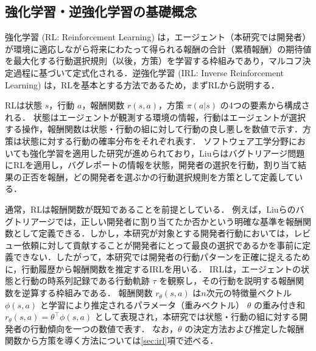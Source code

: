 \documentclass[submit,noauthor,ses,dvipdfmx]{ipsj}
\begin{document}

\vspace{-4mm}
\subsection{強化学習・逆強化学習の基礎概念}

強化学習 (RL: Reinforcement Learning) は，エージェント（本研究では開発者）が環境に適応しながら将来にわたって得られる報酬の合計（累積報酬）の期待値を最大化する行動選択規則（以後，方策）を学習する枠組みであり，マルコフ決定過程に基づいて定式化される．逆強化学習 (IRL: Inverse Reinforcement Learning) は，RLを基本とする方法であるため，まずRLから説明する．

RLは状態 $s$，行動 $a$，報酬関数 $r(s, a)$，方策 $\pi(a|s)$ の4つの要素から構成される．
状態はエージェントが観測する環境の情報，行動はエージェントが選択する操作，報酬関数は状態・行動の組に対して行動の良し悪しを数値で示す．方策は状態に対する行動の確率分布をそれぞれ表す．
ソフトウェア工学分野においても強化学習を適用した研究が進められており，Liuらはバグトリアージ問題にRLを適用し，バグレポートの情報を状態，開発者の選択を行動，割り当て結果の正否を報酬，どの開発者を選ぶかの行動選択規則を方策として定義している\cite{RL}．

通常，RLは報酬関数が既知であることを前提としている．
例えば，Liuらのバグトリアージでは，正しい開発者に割り当てたか否かという明確な基準を報酬関数として定義できる．しかし，本研究が対象とする開発者行動においては，レビュー依頼に対して貢献することが開発者にとって最良の選択であるかを事前に定義できない．したがって，本研究では開発者の行動パターンを正確に捉えるために，行動履歴から報酬関数を推定するIRLを用いる．
IRLは，エージェントの状態と行動の時系列記録である行動軌跡 $\tau$ を観察し，その行動を説明する報酬関数を逆算する枠組みである．
報酬関数 $r_\theta(s,a)$ は$n$次元の特徴量ベクトル $\phi(s, a)$ と学習により推定されるパラメータ（重みベクトル） $\theta$ の重み付き和$r_\theta(s,a) = \theta^\top \phi(s,a)$ として表現され，本研究では状態・行動の組に対する開発者の行動傾向を一つの数値で表す．
なお，$\theta$ の決定方法および推定した報酬関数から方策を導く方法については\ref{sec:irl}項で述べる．
\end{document}
